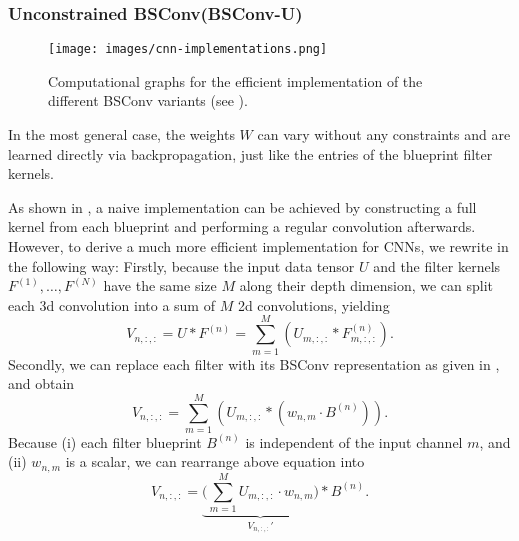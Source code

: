 \documentclass[10pt,twocolumn,letterpaper]{article}
\newcommand{\DCCK}{BSConv\xspace}
\newcommand{\DCCKU}{\DCCK-U\xspace}
\newcommand{\tensorIn}{U}
\newcommand{\tensorOut}{V}
\newcommand{\filter}[1]{F^{(#1)}}
\newcommand{\blueprint}[1]{B^{(#1)}}
\newcommand{\weight}{w}
\newcommand{\weightMatrix}{W}
\newcommand{\channelInCount}{M}
\newcommand{\channelInIndex}{m}
\newcommand{\channelOutCount}{N}
\newcommand{\channelOutIndex}{n}
\begin{document}
\subsubsection{Unconstrained \DCCK (\DCCKU)}
\label{subsubsec:dcckU}
\begin{figure}
	\center
	\texttt{[image: images/cnn-implementations.png]}
	\caption{Computational graphs for the efficient implementation of the different \DCCK variants (see ).
	}
     \label{fig:cnnImplementationsDcck}
\end{figure}
In the most general case, the weights $\weightMatrix$ can vary without any constraints and are learned directly via backpropagation, just like the entries of the blueprint filter kernels.

As shown in , a naive implementation can be achieved by constructing a full kernel from each blueprint and performing a regular convolution afterwards.
However, to derive a much more efficient implementation for CNNs, we rewrite  in the following way:
Firstly, because the input data tensor $\tensorIn$ and the filter kernels $\filter{1}, \dots, \filter{\channelOutCount}$ have the same size $\channelInCount$ along their depth dimension, we can split each 3d convolution into a sum of $\channelInCount$ 2d convolutions, yielding
\begin{equation}
	\tensorOut_{\channelOutIndex, :, :} = \tensorIn * \filter{\channelOutIndex} = \sum_{\channelInIndex = 1}^{\channelInCount} \left( \tensorIn_{\channelInIndex, :, :} * \filter{\channelOutIndex}_{\channelInIndex, :, :} \right) .
\end{equation}
Secondly, we can replace each filter with its \DCCK representation as given in , and obtain
\begin{equation}
	\tensorOut_{\channelOutIndex, :, :} = \sum_{\channelInIndex = 1}^{\channelInCount} \left( \tensorIn_{\channelInIndex, :, :} * \left(  \weight_{\channelOutIndex, \channelInIndex} \cdot \blueprint{\channelOutIndex} \right) \right).
\end{equation}
Because (i) each filter blueprint $\blueprint{\channelOutIndex}$ is independent of the input channel $\channelInIndex$, and (ii) $\weight_{\channelOutIndex, \channelInIndex}$ is a scalar, we can rearrange above equation into
\begin{equation}
	\tensorOut_{\channelOutIndex, :, :} = \underbrace{ \Big( \sum_{\channelInIndex = 1}^{\channelInCount} \tensorIn_{\channelInIndex, :, :} \cdot \weight_{\channelOutIndex, \channelInIndex} \Big) }_{\tensorOut_{\channelOutIndex, :, :}'} * \blueprint{\channelOutIndex}.
	\label{eq:dcckV1Intermediate}
\end{equation}
\end{document}
